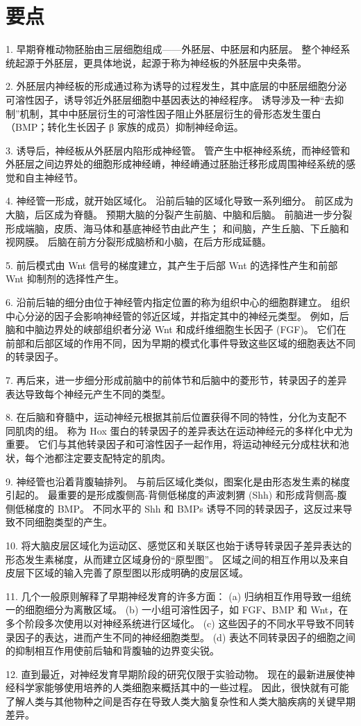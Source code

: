 \section{要点}
1. 早期脊椎动物胚胎由三层细胞组成——外胚层、中胚层和内胚层。 整个神经系统起源于外胚层，更具体地说，起源于称为神经板的外胚层中央条带。 

2. 外胚层内神经板的形成通过称为诱导的过程发生，其中底层的中胚层细胞分泌可溶性因子，诱导邻近外胚层细胞中基因表达的神经程序。 诱导涉及一种“去抑制”机制，其中中胚层衍生的可溶性因子阻止外胚层衍生的骨形态发生蛋白（BMP；转化生长因子 β 家族的成员）抑制神经命运。 

3. 诱导后，神经板从外胚层内陷形成神经管。 管产生中枢神经系统，而神经管和外胚层之间边界处的细胞形成神经嵴，神经嵴通过胚胎迁移形成周围神经系统的感觉和自主神经节。 

4. 神经管一形成，就开始区域化。 沿前后轴的区域化导致一系列细分。 前区成为大脑，后区成为脊髓。 预期大脑的分裂产生前脑、中脑和后脑。 前脑进一步分裂形成端脑，皮质、海马体和基底神经节由此产生； 和间脑，产生丘脑、下丘脑和视网膜。 后脑在前方分裂形成脑桥和小脑，在后方形成延髓。 

5. 前后模式由 Wnt 信号的梯度建立，其产生于后部 Wnt 的选择性产生和前部 Wnt 抑制剂的选择性产生。 

6. 沿前后轴的细分由位于神经管内指定位置的称为组织中心的细胞群建立。 组织中心分泌的因子会影响神经管的邻近区域，并指定其中的神经元类型。 例如，后脑和中脑边界处的峡部组织者分泌 Wnt 和成纤维细胞生长因子 (FGF)。 它们在前部和后部区域的作用不同，因为早期的模式化事件导致这些区域的细胞表达不同的转录因子。

7. 再后来，进一步细分形成前脑中的前体节和后脑中的菱形节，转录因子的差异表达导致每个神经元产生不同的类型。 

8. 在后脑和脊髓中，运动神经元根据其前后位置获得不同的特性，分化为支配不同肌肉的组。 称为 Hox 蛋白的转录因子的差异表达在运动神经元的多样化中尤为重要。 它们与其他转录因子和可溶性因子一起作用，将运动神经元分成柱状和池状，每个池都注定要支配特定的肌肉。 

9. 神经管也沿着背腹轴排列。 与前后区域化类似，图案化是由形态发生素的梯度引起的。 最重要的是形成腹侧高-背侧低梯度的声波刺猬 (Shh) 和形成背侧高-腹侧低梯度的 BMP。 不同水平的 Shh 和 BMPs 诱导不同的转录因子，这反过来导致不同细胞类型的产生。 

10. 将大脑皮层区域化为运动区、感觉区和关联区也始于诱导转录因子差异表达的形态发生素梯度，从而建立区域身份的“原型图”。 区域之间的相互作用以及来自皮层下区域的输入完善了原型图以形成明确的皮层区域。 

11. 几个一般原则解释了早期神经发育的许多方面： (a) 归纳相互作用导致一组统一的细胞细分为离散区域。 (b) 一小组可溶性因子，如 FGF、BMP 和 Wnt，在多个阶段多次使用以对神经系统进行区域化。 (c) 这些因子的不同水平导致不同转录因子的表达，进而产生不同的神经细胞类型。 (d) 表达不同转录因子的细胞之间的抑制相互作用使前后轴和背腹轴的边界变尖锐。 

12. 直到最近，对神经发育早期阶段的研究仅限于实验动物。 现在的最新进展使神经科学家能够使用培养的人类细胞来概括其中的一些过程。 因此，很快就有可能了解人类与其他物种之间是否存在导致人类大脑复杂性和人类大脑疾病的关键早期差异。

